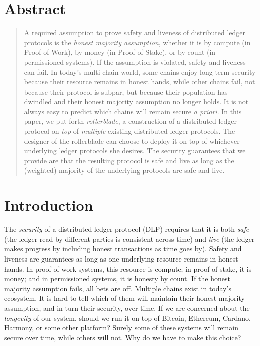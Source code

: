 \section{Abstract}
\begin{abstract}
A required assumption to prove safety and liveness of distributed ledger protocols
is the \emph{honest majority assumption}, whether it is by compute (in Proof-of-Work),
by money (in Proof-of-Stake), or by count (in permissioned systems). If the assumption
is violated, safety and liveness can fail. In today's multi-chain world, some chains
enjoy long-term security because their resource remains in honest hands, while other
chains fail, not because their protocol is subpar, but because their population has
dwindled and their honest majority assumption no longer holds. It is not always easy
to predict which chains will remain secure \emph{a priori}. In this paper, we put
forth \emph{rollerblade}, a construction of a distributed ledger protocol on \emph{top
} of
\emph{multiple} existing distributed ledger protocols. The designer of the rollerblade can
choose to deploy it on top of whichever underlying ledger protocols she desires.
The security guarantees that we provide are that the resulting protocol is safe
and live as long as the (weighted) majority of the underlying protocols are safe
and live.
\end{abstract}

\section{Introduction}
The \emph{security} of a distributed ledger protocol (DLP) requires that it is both \emph{safe} (the ledger
read by different parties is consistent across time) and \emph{live} (the ledger makes progress
by including honest transactions as time goes by). Safety and liveness are guarantees as
long as one underlying resource remains in honest hands. In proof-of-work systems, this
resource is compute; in proof-of-stake, it is money; and in permissioned systems, it is
honesty by count. If the honest majority assumption fails, all bets are off.
Multiple chains exist in today's ecosystem. It is hard to tell which of them will
maintain their honest majority assumption, and in turn their security, over time.
If we are concerned about the \emph{longevity} of our system, should we run it on top of
Bitcoin, Ethereum, Cardano, Harmony, or some other platform? Surely some of these
systems will remain secure over time, while others will not. Why do we have to make
this choice?

